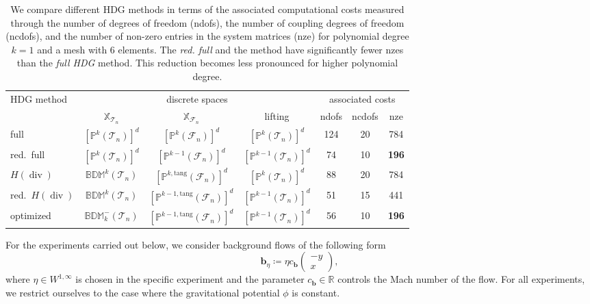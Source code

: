 \documentclass{m2an}
\newcommand{\bflow}{\mathbf{b}}
\renewcommand{\div}{\operatorname{div}}
\newcommand{\calT}{\mathcal{T}}
\newcommand{\X}{\mathbb{X}}
\newcommand{\XT}{\X_{\mathcal{T}_n}}
\newcommand{\XF}{\X_{\mathcal{F}_n}}
\newcommand{\Tn}{\calT_n}
\newcommand{\Fn}{\mathcal{F}_n}
\theoremstyle{plain}
\theoremstyle{definition}
\begin{document}
\begin{table}[!htbp]
   \begin{tabular}{lcccccc}
      \toprule
      HDG method & \multicolumn{3}{c}{discrete spaces} & \multicolumn{3}{c}{associated costs} \\%
      \cmidrule[0.4pt](r{0.125em}){1-1}%
      \cmidrule[0.4pt](lr{0.25em}){2-4}%
      \cmidrule[0.4pt](lr{0.25em}){5-7}%
      & $\XT$ & $\XF$ & lifting & ndofs & ncdofs& nze \\%
      \cmidrule[0.4pt](r{0.125em}){1-1}%
      \cmidrule[0.4pt](lr{0.125em}){2-2}%
      \cmidrule[0.4pt](lr{0.125em}){3-3}%
      \cmidrule[0.4pt](lr{0.125em}){4-4}%
      \cmidrule[0.4pt](lr{0.125em}){5-5}%
      \cmidrule[0.4pt](lr{0.125em}){6-6}%
      \cmidrule[0.4pt](lr{0.125em}){7-7}%
      full & $[\mathbb{P}^k(\Tn)]^d$ & $[\mathbb{P}^k(\Fn)]^d$ & $[\mathbb{P}^k(\Tn)]^d$ & 124 & 20 & 784 \\
      red.~full& $[\mathbb{P}^k(\Tn)]^d$ & $[\mathbb{P}^{k-1}(\Fn)]^d$ & $[\mathbb{P}^{k-1}(\Tn)]^d$ & 74 & 10 & \textbf{196} \\
      $H(\div)$& $\mathbb{BDM}^k(\Tn)$ & $[\mathbb{P}^{k,\text{tang}}(\Fn)]^d$ & $[\mathbb{P}^k(\Tn)]^d$ & 88 &  20 & 784\\
      red.~$H(\div)$& $\mathbb{BDM}^k(\Tn)$ & $[\mathbb{P}^{k-1,\text{tang}}(\Fn)]^d$ & $[\mathbb{P}^{k-1}(\Tn)]^d$ & 51 &  15 & 441 \\
      optimized & $\mathbb{BDM}^{-}_k(\Tn)$ & $[\mathbb{P}^{k-1,\text{tang}}(\Fn)]^d$ & $[\mathbb{P}^{k-1}(\Tn)]^d$ & 56 & 10 & \textbf{196}\\
      \bottomrule
   \end{tabular}
   \caption{We compare different HDG methods in terms of the associated computational costs measured through the number of degrees of freedom (ndofs), the number of coupling degrees of freedom (ncdofs), and the number of non-zero entries in the system matrices (nze) for polynomial degree $k = 1$ and a mesh with $6$ elements. The \emph{red. full} and the  method have significantly fewer nzes than the \emph{full HDG} method. This reduction becomes less pronounced for higher polynomial degree.}
   \label{table:discretizations}
\end{table}


 For the experiments carried out below, we consider background flows of the following form
\begin{equation}\label{eq:numex:BFlows}
   \bflow_{\eta} \coloneqq \eta c_{\bflow} \begin{pmatrix}
      -y \\ x
   \end{pmatrix},
\end{equation}
where $\eta \in W^{1,\infty}$ is chosen in the specific experiment and the parameter $c_{\bflow} \in \mathbb{R}$ controls the Mach number of the flow. For all experiments, we restrict ourselves to the case where the gravitational potential $\phi$ is constant.
\end{document}
